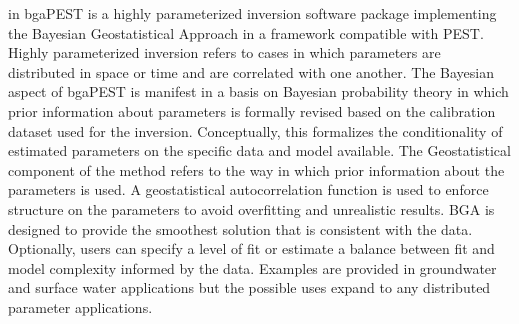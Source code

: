 \documentclass[11pt,oneside,onecolumn]{usgsreport}
\begin{document}

\setlength{\hfuzz}{12pt}
\makefrontmatter
\onecolumn
\setlength{\hfuzz}{0.1pt}

\pagestyle{body}


\raggedcolumns
\raggedright
{}
 in
bgaPEST is a highly parameterized inversion software package implementing
the Bayesian Geostatistical Approach in a framework compatible with
PEST. Highly parameterized inversion refers to cases in which parameters
are distributed in space or time and are correlated with one another.
The Bayesian aspect of bgaPEST is manifest in a basis on Bayesian
probability theory in which prior information about parameters is
formally revised based on the calibration dataset used for the inversion.
Conceptually, this formalizes the conditionality of estimated parameters
on the specific data and model available. The Geostatistical component
of the method refers to the way in which prior information about the
parameters is used. A geostatistical autocorrelation function is used
to enforce structure on the parameters to avoid overfitting and unrealistic
results. BGA is designed to provide the smoothest solution that is
consistent with the data. Optionally, users can specify a level of
fit or estimate a balance between fit and model complexity informed
by the data. Examples are provided in groundwater and surface water
applications but the possible uses expand to any distributed parameter
applications. 
\end{document}
